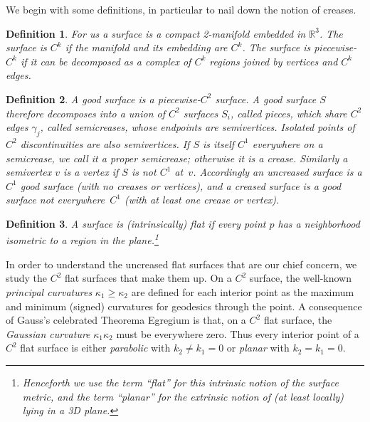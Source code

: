 \documentclass[11pt,letterpaper]{article}
\newtheorem{definition}{Definition}
\newcommand\term[1]{\emph{#1}}
\newcommand\R{\mathbb R}
\begin{document}
We begin with some definitions, in particular to nail down the notion
of creases.

\begin{definition}
  For us a \term{surface} is a compact 2-manifold embedded in $\R^3$.
  The surface is $C^k$ if the manifold and its embedding are $C^k$.
  The surface is \term{piecewise-$C^k$} if it can be decomposed as a
  complex of $C^k$ regions joined by vertices and $C^k$ edges.
\end{definition}

\begin{definition}
  A \term{good surface} is a piecewise-$C^2$ surface.  A good surface
  $S$ therefore decomposes into a union of $C^2$ surfaces $S_i$,
  called \term{pieces}, which share $C^2$ edges $\gamma_j$, called
  \term{semicreases}, whose endpoints are \term{semivertices}.
  Isolated points of $C^2$ discontinuities are also \term{semivertices}.
  If $S$ is itself $C^1$ everywhere on a semicrease,
  we call it a \term{proper semicrease}; otherwise it is a \term{crease}.
  Similarly a semivertex $v$ is a \term{vertex} if $S$ is not $C^1$ at~$v$.
  Accordingly an \term{uncreased surface} is a $C^1$ good surface
  (with no creases or vertices),
  and a \term{creased surface} is a good surface not everywhere~$C^1$
  (with at least one crease or vertex).
\end{definition}

\begin{definition}
  A surface is \term{(intrinsically) flat} if every point $p$ has a
  neighborhood isometric to a region in the plane.\footnote{Henceforth we use the term ``flat'' for this intrinsic notion
    of the surface metric, and the term ``planar'' for the extrinsic notion
    of (at least locally) lying in a 3D plane.}
\end{definition}

In order to understand the uncreased flat surfaces that are our chief
concern, we study the $C^2$ flat surfaces that make them up.
On a $C^2$ surface, the well-known \term{principal curvatures}
$\kappa_1 \geq \kappa_2$ are defined for each interior point as the
maximum and minimum (signed) curvatures for geodesics through the
point.  A consequence of Gauss's celebrated Theorema Egregium
\cite{Gauss-1902} is that, on a $C^2$ flat surface, the \term{Gaussian
  curvature} $\kappa_1\kappa_2$ must be everywhere zero.  Thus every
interior point of a $C^2$ flat surface is either \term{parabolic} with
$k_2 \neq k_1 = 0$ or \term{planar} with $k_2 = k_1 = 0$.
\end{document}
